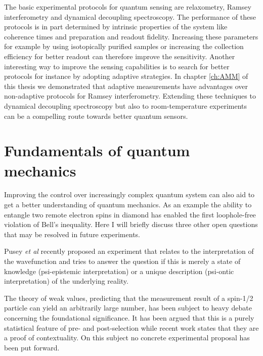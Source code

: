 The basic experimental protocols for quantum sensing are relaxometry, Ramsey interferometry and dynamical decoupling spectroscopy. The performance of these protocols is in part determined by intrinsic properties of the system like coherence times and preparation and readout fidelity. Increasing these parameters for example by using isotopically purified samples or increasing the collection efficiency for better readout can therefore improve the sensitivity. Another interesting way to improve the sensing capabilities is to search for better protocols for instance by adopting adaptive strategies. In chapter \ref{ch:AMM} of this thesis we demonstrated that adaptive measurements have advantages over non-adaptive protocols for Ramsey interferometry. Extending these techniques to dynamical decoupling spectroscopy but also to room-temperature experiments can be a compelling route towards better quantum sensors.

\section{Fundamentals of quantum mechanics}

Improving the control over increasingly complex quantum system can also aid to get a better understanding of quantum mechanics. As an example the ability to entangle two remote electron spins in diamond has enabled the first loophole-free violation of Bell's inequality\cite{Hensen_Nature_2015}. Here I will briefly discuss three other open questions that may be resolved in future experiments.

Pusey \textit{et al}\cite{Pusey_NatPhys_2012} recently proposed an experiment that relates to the interpretation of the wavefunction and tries to answer the question if this is merely a state of knowledge (psi-epistemic interpretation) or a unique description (psi-ontic interpretation) of the underlying reality. 

The theory of weak values, predicting that the measurement result of a spin-1/2 particle can yield an arbitrarily large number, has been subject to heavy debate concerning the foundational significance. It has been argued that this is a purely statistical feature of pre- and post-selection\cite{Ferrie_Phys.Rev.Lett._2014} while recent work states that they are a proof of contextuality\cite{Pusey_Phys.Rev.Lett._2014}. On this subject no concrete experimental proposal has been put forward.

